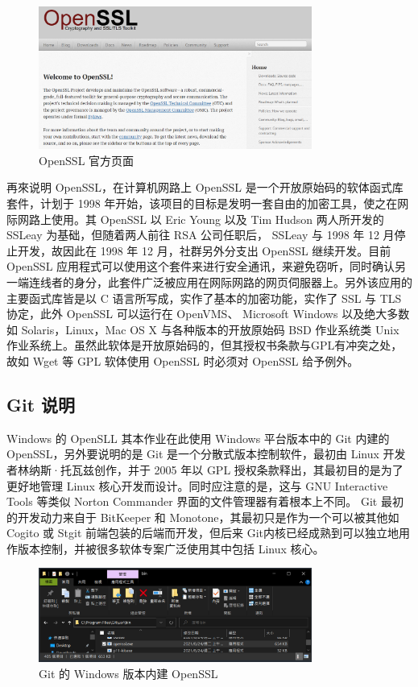 \begin{figure}[htb]
\centering 
\includegraphics[width=0.80\textwidth]{img/ch1s2m1.png} 
\caption{OpenSSL 官方页面}
\label{Test}
\end{figure}

再來说明 OpenSSL，在计算机网路上 OpenSSL 是一个开放原始码的软体函式库套件，计划于 1998 年开始，该项目的目标是发明一套自由的加密工具，使之在网际网路上使用。其 OpenSSL 以 Eric Young 以及 Tim Hudson 两人所开发的 SSLeay 为基础，但随着两人前往 RSA 公司任职后， SSLeay 与 1998 年 12 月停止开发，故因此在 1998 年 12 月，社群另外分支出 OpenSSL 继续开发。目前 OpenSSL 应用程式可以使用这个套件来进行安全通讯，来避免窃听，同时确认另一端连线者的身分，此套件广泛被应用在网际网路的网页伺服器上。另外该应用的主要函式库皆是以 C 语言所写成，实作了基本的加密功能，实作了 SSL 与 TLS 协定，此外 OpenSSL 可以运行在 OpenVMS、 Microsoft Windows 以及绝大多数如 Solaris，Linux，Mac OS X 与各种版本的开放原始码 BSD 作业系统类 Unix 作业系统上。虽然此软体是开放原始码的，但其授权书条款与GPL有冲突之处，故如 Wget 等 GPL 软体使用 OpenSSL 时必须对 OpenSSL 给予例外。

\subsection{Git 说明}

Windows 的 OpenSLL 其本作业在此使用 Windows 平台版本中的 Git 内建的 OpenSSL，另外要说明的是 Git 是一个分散式版本控制软件，最初由 Linux 开发者林纳斯·托瓦兹创作，并于 2005 年以 GPL 授权条款释出，其最初目的是为了更好地管理 Linux 核心开发而设计。同时应注意的是，这与 GNU Interactive Tools 等类似 Norton Commander 界面的文件管理器有着根本上不同。 Git 最初的开发动力来自于 BitKeeper 和 Monotone，其最初只是作为一个可以被其他如 Cogito 或 Stgit 前端包装的后端而开发，但后来 Git内核已经成熟到可以独立地用作版本控制，并被很多软体专案广泛使用其中包括 Linux 核心。

\begin{figure}[htb]
\centering 
\includegraphics[width=0.80\textwidth]{img/ch1s2m2.png} 
\caption{Git 的 Windows 版本内建 OpenSSL}
\label{Test}
\end{figure}


